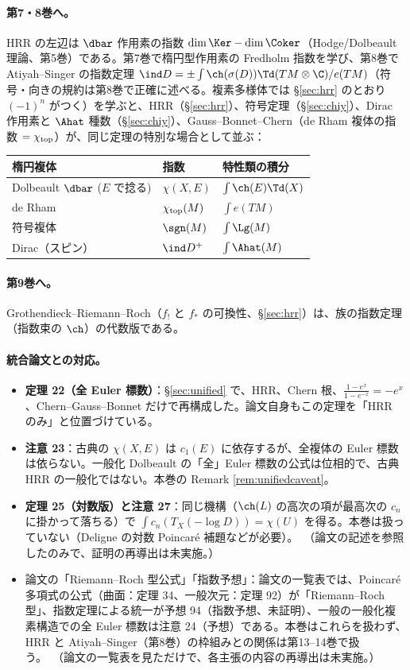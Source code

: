 \paragraph{第7・8巻へ。}HRR の左辺は $\dbar$ 作用素の指数 $\dim\Ker-\dim\Coker$（Hodge/Dolbeault 理論、第5巻）である。第7巻で楕円型作用素の Fredholm 指数を学び、第8巻で Atiyah--Singer の指数定理 $\ind D=\pm\int\ch(\sigma(D))\Td(TM\otimes\C)/e(TM)$（符号・向きの規約は第8巻で正確に述べる。複素多様体では \S\ref{sec:hrr} のとおり $(-1)^n$ がつく）を学ぶと、HRR（\S\ref{sec:hrr}）、符号定理（\S\ref{sec:chiy}）、Dirac 作用素と $\Ahat$ 種数（\S\ref{sec:chiy}）、Gauss--Bonnet--Chern（de Rham 複体の指数 $=\chi_{\rm top}$）が、同じ定理の特別な場合として並ぶ：
\begin{center}
\begin{tabular}{l|l|l}
\toprule
楕円複体 & 指数 & 特性類の積分\\
\midrule
Dolbeault $\dbar$ ($E$ で捻る) & $\chi(X,E)$ & $\int\ch(E)\Td(X)$\\
de Rham & $\chi_{\rm top}(M)$ & $\int e(TM)$\\
符号複体 & $\sgn(M)$ & $\int\Lg(M)$\\
Dirac（スピン） & $\ind D^+$ & $\int\Ahat(M)$\\
\bottomrule
\end{tabular}
\end{center}
\paragraph{第9巻へ。}Grothendieck--Riemann--Roch（$f_!$ と $f_*$ の可換性、\S\ref{sec:hrr}）は、族の指数定理（指数束の $\ch$）の代数版である。
\paragraph{統合論文との対応。}
\begin{itemize}
\item \textbf{定理 22（全 Euler 標数）}：\S\ref{sec:unified} で、HRR、Chern 根、$\frac{1-e^x}{1-e^{-x}}=-e^x$、Chern--Gauss--Bonnet だけで再構成した。論文自身もこの定理を「HRR のみ」と位置づけている。
\item \textbf{注意 23}：古典の $\chi(X,E)$ は $c_1(E)$ に依存するが、全複体の Euler 標数は依らない。一般化 Dolbeault の「全」Euler 標数の公式は位相的で、古典 HRR の一般化ではない。本巻の Remark \ref{rem:unifiedcaveat}。
\item \textbf{定理 25（対数版）と注意 27}：同じ機構（$\ch(L)$ の高次の項が最高次の $c_n$ に掛かって落ちる）で $\int c_n(T_X(-\log D))=\chi(U)$ を得る。本巻は扱っていない（Deligne の対数 Poincaré 補題などが必要）。\tQ\ （論文の記述を参照したのみで、証明の再導出は未実施。）
\item 論文の「Riemann--Roch 型公式」「指数予想」：論文の一覧表では、Poincaré 多項式の公式（曲面：定理 34、一般次元：定理 92）が「Riemann--Roch 型」、指数定理による統一が予想 94（指数予想、未証明）、一般の一般化複素構造での全 Euler 標数は注意 24（予想）である。本巻はこれらを扱わず、HRR と Atiyah--Singer（第8巻）の枠組みとの関係は第13--14巻で扱う。\tQ\ （論文の一覧表を見ただけで、各主張の内容の再導出は未実施。）
\end{itemize}
